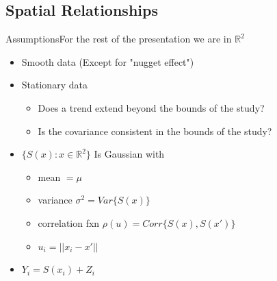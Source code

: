 \documentclass{beamer}
\begin{document}
\subsection{Spatial Relationships}
\begin{frame}{Assumptions}{For the rest of the presentation we are in $\mathbb{R}^2$}
  \begin{itemize}
  \item Smooth data (Except for "nugget effect")
  \item Stationary data
	\begin{itemize}
   		\item Does a trend extend beyond the bounds of the study?
   		\item Is the covariance consistent in the bounds of the study?
    \end{itemize}
  \item $\{S(x) : x \in \mathbb{R}^2 \}$ Is Gaussian with
  \begin{itemize}
  	\item mean $= \mu$
    \item variance $\sigma^2 = Var\{S(x)\}$
    \item correlation fxn $\rho(u) = Corr\{S(x), S(x')\}$
  	\item $u_i = ||x_i - x'||$
  \end{itemize}
  \item $Y_i = S(x_i) + Z_i$
  \end{itemize}
\end{frame}
\end{document}
